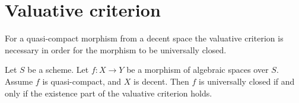 \section{Valuative criterion}
\label{section-valuative-criterion-universally-closed}

\noindent
For a quasi-compact morphism from a decent space the valuative
criterion is necessary in order for the morphism to be
universally closed.


\begin{proposition}
\label{proposition-characterize-universally-closed}
Let $S$ be a scheme. Let $f : X \to Y$ be a morphism of algebraic spaces
over $S$. Assume $f$ is quasi-compact, and $X$ is decent. Then $f$ is
universally closed if and only if the existence part of the valuative
criterion holds.
\end{proposition}

